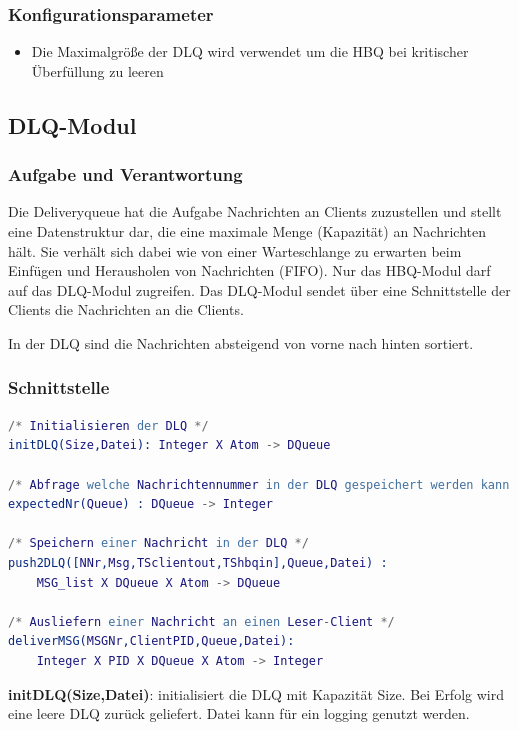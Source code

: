 \documentclass{article}
\begin{document}
\subsubsection{Konfigurationsparameter}
\begin{itemize}
	\item Die Maximalgröße der DLQ wird verwendet um die HBQ bei kritischer Überfüllung zu leeren
\end{itemize}
\newpage

\subsection{DLQ-Modul}
\subsubsection{Aufgabe und Verantwortung}
Die Deliveryqueue hat die Aufgabe Nachrichten an Clients zuzustellen und stellt eine Datenstruktur dar, die eine
maximale Menge (Kapazität) an Nachrichten hält. Sie verhält sich dabei wie von einer Warteschlange zu erwarten beim
Einfügen und Herausholen von Nachrichten (FIFO). Nur das HBQ-Modul darf auf das DLQ-Modul zugreifen. Das DLQ-Modul
sendet über eine Schnittstelle der Clients die Nachrichten an die Clients.

In der DLQ sind die Nachrichten absteigend von vorne nach hinten sortiert.

\subsubsection{Schnittstelle}
\begin{lstlisting}[language=erlang]
/* Initialisieren der DLQ */
initDLQ(Size,Datei): Integer X Atom -> DQueue

/* Abfrage welche Nachrichtennummer in der DLQ gespeichert werden kann */
expectedNr(Queue) : DQueue -> Integer

/* Speichern einer Nachricht in der DLQ */
push2DLQ([NNr,Msg,TSclientout,TShbqin],Queue,Datei) :
    MSG_list X DQueue X Atom -> DQueue

/* Ausliefern einer Nachricht an einen Leser-Client */
deliverMSG(MSGNr,ClientPID,Queue,Datei):
    Integer X PID X DQueue X Atom -> Integer
\end{lstlisting}

\textbf{initDLQ(Size,Datei)}: initialisiert die DLQ mit Kapazität Size. Bei Erfolg wird eine leere DLQ zurück geliefert.
Datei kann für ein logging genutzt werden.\\
\end{document}
